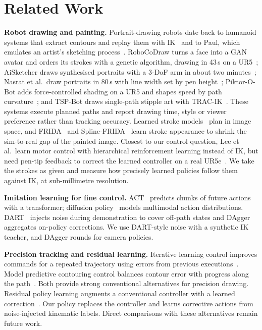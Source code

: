 \documentclass[conference]{IEEEtran}
\begin{document}
\section{Related Work}

\textbf{Robot drawing and painting.} Portrait-drawing robots date back to humanoid systems that extract contours
and replay them with IK~\cite{calinon2005humanoid} and to Paul, which emulates an artist's sketching
process~\cite{tresset2013paul}. RoboCoDraw turns a
face into a GAN avatar and orders its strokes with a genetic algorithm, drawing in 43\,s on a
UR5~\cite{wang2019robocodraw}; AiSketcher draws synthesised portraits with a 3-DoF arm in about two
minutes~\cite{gao2020aisketcher}; Nasrat et al.\ draw portraits in 80\,s with line width set by pen
height~\cite{nasrat2023artistic}; Piktor-O-Bot adds force-controlled shading on a UR5 and shapes speed by path
curvature~\cite{hoang2024piktor,csempesz2024piktor}; and TSP-Bot draws single-path stipple art
with TRAC-IK~\cite{song2022tspbot}. These systems execute planned paths and report drawing time, style or
viewer preference rather than tracking accuracy. Learned stroke models~\cite{ha2018sketchrnn,huang2019paint}
plan in image space, and FRIDA~\cite{schaldenbrand2023frida} and Spline-FRIDA~\cite{chen2024splinefrida}
learn stroke appearance to shrink the sim-to-real gap of the painted image. Closest to our control question,
Lee et al.\ learn motor control with hierarchical reinforcement learning instead of IK, but need pen-tip
feedback to correct the learned controller on a real UR5e~\cite{lee2022scratch}. We take the strokes as given
and measure how precisely learned policies follow them against IK, at sub-millimetre resolution.

\textbf{Imitation learning for fine control.} ACT~\cite{zhao2023act} predicts chunks of future actions with a
transformer; diffusion policy~\cite{chi2023diffusion} models multimodal action distributions. DART~\cite{laskey2017dart}
injects noise during demonstration to cover off-path states and DAgger~\cite{ross2011dagger} aggregates on-policy
corrections. We use DART-style noise with a synthetic IK teacher, and DAgger rounds for camera policies.

\textbf{Precision tracking and residual learning.} Iterative learning control improves commands for a repeated
trajectory using errors from previous executions~\cite{bristow2006ilc}. Model predictive contouring control
balances contour error with progress along the path~\cite{lam2010mpcc}. Both provide strong conventional
alternatives for precision drawing. Residual policy learning augments a conventional controller with a learned
correction~\cite{silver2018residual,johannink2019residual}. Our policy replaces the controller and learns
corrective actions from noise-injected kinematic labels. Direct comparisons with these alternatives remain
future work.
\end{document}
